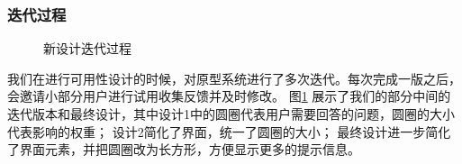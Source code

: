 \subsubsection{迭代过程}
\begin{figure}[h]
    \centering
    \caption{新设计迭代过程}
    \label{fig:diag_new}
\end{figure}
我们在进行可用性设计的时候，对原型系统进行了多次迭代。每次完成一版之后，会邀请小部分用户进行试用收集反馈并及时修改。
图\ref{fig:diag_new} 展示了我们的部分中间的迭代版本和最终设计，其中设计1中的圆圈代表用户需要回答的问题，圆圈的大小代表影响的权重；
设计2简化了界面，统一了圆圈的大小；
最终设计进一步简化了界面元素，并把圆圈改为长方形，方便显示更多的提示信息。

